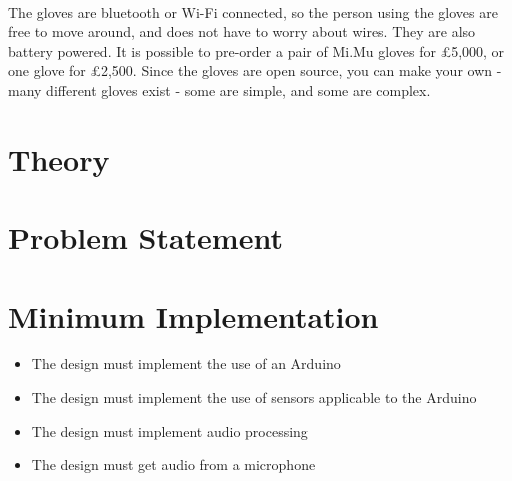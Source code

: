 \begin{minipage}{\linewidth}%
\label{mimu}
\end{minipage}\\

The gloves are bluetooth or Wi-Fi connected, so the person using the gloves are free to move around, and does not have to worry about wires. They are also battery powered. It is possible to pre-order a pair of Mi.Mu gloves for £5,000, or one glove for £2,500. 
Since the gloves are open source, you can make your own - many different gloves exist - some are simple, and some are complex.

\section{Theory}

\section{Problem Statement}


\section{Minimum Implementation}
\begin{itemize}
	\item The design must implement the use of an Arduino
	\item The design must implement the use of sensors applicable to the Arduino
	\item The design must implement audio processing
	\item The design must get audio from a microphone
\end{itemize}

